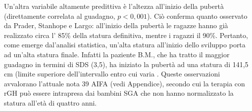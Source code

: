 Un'altra variabile altamente predittiva è l'altezza all'inizio della pubertà (direttamente correlata al guadagno, $p < 0,001$). Ciò conferma quanto osservato da Prader, Stanhope e Largo: 
 all'inizio della pubertà le ragazze hanno già realizzato circa l' 85\% della statura definitiva, mentre i ragazzi il 90\%. Pertanto, come emerge dal'analisi statistica, un'alta statura all'inizio dello sviluppo porta ad un'alta statura finale. Infatti la paziente B.M., che ha tratto il maggior guadagno in termini di SDS (3,5), ha iniziato la pubertà ad una statura di 141,5 cm (limite superiore dell'intervallo entro cui varia . 
Queste osservazioni avvalorano l'attuale nota 39 AIFA (vedi Appendice), secondo cui la terapia con rGH può essere intrapresa dai bambini SGA che non hanno normalizzato la statura all'età di quattro anni.


  